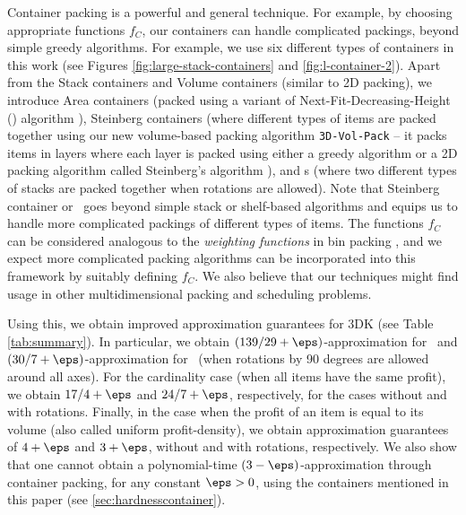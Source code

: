 Container packing is a powerful and general technique. For example, by choosing appropriate functions $f_C$, our containers can handle complicated packings, beyond simple greedy algorithms. 
For example, we use six different types of containers in this work (see Figures  \ref{fig:large-stack-containers} and \ref{fig:l-container-2}).
Apart from the Stack containers and Volume containers (similar to 2D packing), we introduce Area containers (packed using a variant of Next-Fit-Decreasing-Height (\NFDH) algorithm \cite{coffman1980performance}), Steinberg containers (where different types of items are packed together using our new volume-based packing algorithm \texttt{3D-Vol-Pack}
-- it  packs items in layers where each layer is packed using either a greedy algorithm or a 2D packing algorithm called Steinberg's algorithm \cite{steinberg}), and \LContainer{}s (where two different types of stacks are packed together when rotations are allowed). 
Note that Steinberg container or \LContainer~goes beyond simple stack or shelf-based algorithms and equips us to handle more complicated packings of different types of items. 
 The functions $f_C$ can be considered analogous to the {\em weighting functions} in bin packing \cite{coffman1980performance}, and we expect  more complicated packing algorithms can be incorporated into this framework by suitably defining $f_C$.
We also believe that our techniques might find usage in other multidimensional packing and scheduling problems. 



Using this, we obtain improved approximation guarantees for 3DK (see Table \ref{tab:summary}).
In particular, we obtain $(139/29+\eps)$-approximation for \tdk~and $(30/7+\eps)$-approximation for \tdkr~(when rotations by 90 degrees are allowed around all axes). 
For the cardinality case (when all items have the same profit), we obtain $17/4 +\eps$ and $24/7+\eps$, respectively, for the cases without and with rotations. Finally, in the case when the profit of an item is equal to its volume (also called uniform profit-density), we obtain approximation guarantees of $4+\eps$ and $3+\eps$, without and with rotations, respectively. We also show that one cannot obtain a polynomial-time $(3-\eps)$-approximation  through container packing, for any constant $\eps>0$,  using the containers mentioned in this paper (see \cref{sec:hardnesscontainer}).


